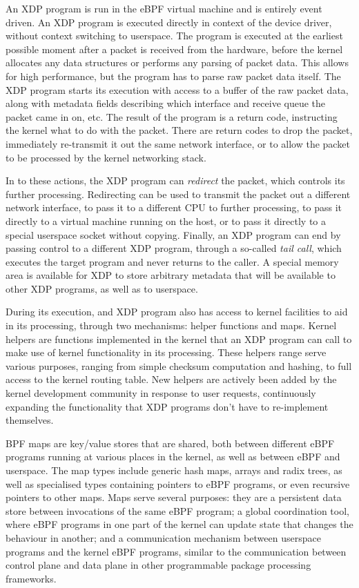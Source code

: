 \documentclass[10pt]{sig-alternate-05-2015}
\begin{document}
An XDP program is run in the eBPF virtual machine and is entirely event driven.
An XDP program is executed directly in context of the device driver, without
context switching to userspace. The program is executed at the earliest possible
moment after a packet is received from the hardware, before the kernel allocates
any data structures or performs any parsing of packet data. This allows for high
performance, but the program has to parse raw packet data itself. The XDP
program starts its execution with access to a buffer of the raw packet data,
along with metadata fields describing which interface and receive queue the
packet came in on, etc. The result of the program is a return code, instructing
the kernel what to do with the packet. There are return codes to drop the
packet, immediately re-transmit it out the same network interface, or to allow
the packet to be processed by the kernel networking stack.

In to these actions, the XDP program can \emph{redirect} the packet, which controls
its further processing. Redirecting can be used to transmit the packet out a
different network interface, to pass it to a different CPU to further
processing, to pass it directly to a virtual machine running on the host, or to
pass it directly to a special userspace socket without copying. Finally, an XDP
program can end by passing control to a different XDP program, through a
so-called \emph{tail call}, which executes the target program and never returns to
the caller. A special memory area is available for XDP to store arbitrary
metadata that will be available to other XDP programs, as well as to userspace.

During its execution, and XDP program also has access to kernel facilities to
aid in its processing, through two mechanisms: helper functions and maps. Kernel
helpers are functions implemented in the kernel that an XDP program can call to
make use of kernel functionality in its processing. These helpers range serve
various purposes, ranging from simple checksum computation and hashing, to full
access to the kernel routing table. New helpers are actively been added by the
kernel development community in response to user requests, continuously
expanding the functionality that XDP programs don't have to re-implement
themselves.

BPF maps are key/value stores that are shared, both between different eBPF
programs running at various places in the kernel, as well as between eBPF and
userspace. The map types include generic hash maps, arrays and radix trees, as
well as specialised types containing pointers to eBPF programs, or even
recursive pointers to other maps. Maps serve several purposes: they are a
persistent data store between invocations of the same eBPF program; a global
coordination tool, where eBPF programs in one part of the kernel can update
state that changes the behaviour in another; and a communication mechanism
between userspace programs and the kernel eBPF programs, similar to the
communication between control plane and data plane in other programmable package
processing frameworks.
\end{document}
